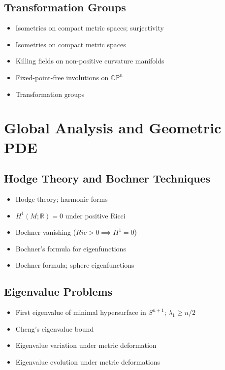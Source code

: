 \documentclass{amsart}
\begin{document}
\subsection{Transformation Groups}
\begin{itemize}
    \item Isometries on compact metric spaces; surjectivity
    \item Isometries on compact metric spaces
    \item Killing fields on non-positive curvature manifolds
    \item Fixed-point-free involutions on $\mathbb{CP}^n$
    \item Transformation groups
    \end{itemize}

\section{Global Analysis and Geometric PDE}

\subsection{Hodge Theory and Bochner Techniques}
\begin{itemize}
    \item Hodge theory; harmonic forms
    \item $H^1(M;\mathbb{R}) = 0$ under positive Ricci
    \item Bochner vanishing ($Ric > 0 \implies H^1 = 0$)
    \item Bochner's formula for eigenfunctions
    \item Bochner formula; sphere eigenfunctions
    \end{itemize}

\subsection{Eigenvalue Problems}
\begin{itemize}
    \item First eigenvalue of minimal hypersurface in $S^{n+1}$; $\lambda_1 \geq n/2$
    \item Cheng's eigenvalue bound
    \item Eigenvalue variation under metric deformation
    \item Eigenvalue evolution under metric deformations
    \end{itemize}
\end{document}
